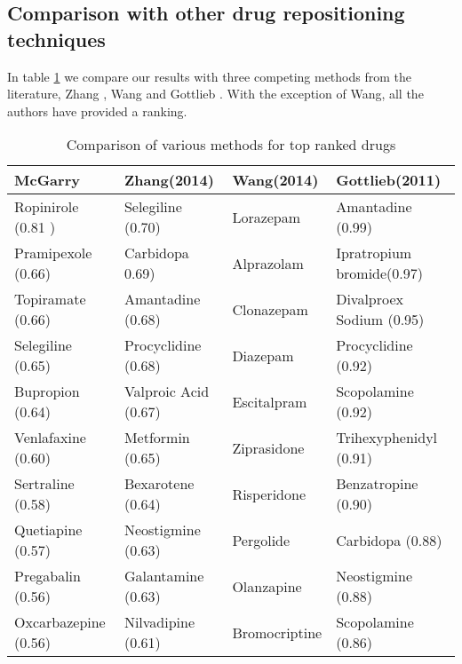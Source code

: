 \documentclass[preprint,12pt]{elsarticle}
\begin{document}
\subsection{Comparison with other drug repositioning techniques}
In table \ref{comparison} we compare our results with three competing methods from the literature, Zhang \cite{Zhang2014}, Wang \cite{Wang2014} and Gottlieb \cite{Gottlieb2011}. With the exception of Wang, all the authors have provided a ranking.

\begin{table}[h]
\centering \caption{Comparison of various methods for top ranked drugs}\label{comparison}
\scriptsize
\begin{tabular}{llll}
  \hline
 McGarry &  Zhang(2014) & Wang(2014) & Gottlieb(2011) \\ 
  \hline
  Ropinirole (0.81 ) & Selegiline (0.70) & Lorazepam & Amantadine (0.99)\\
  Pramipexole (0.66) & Carbidopa 0.69) & Alprazolam& Ipratropium bromide(0.97)\\
  Topiramate  (0.66) & Amantadine (0.68) & Clonazepam& Divalproex Sodium (0.95) \\
  Selegiline (0.65) & Procyclidine (0.68) & Diazepam & Procyclidine (0.92) \\
  Bupropion (0.64) & Valproic Acid (0.67) & Escitalpram & Scopolamine (0.92) \\
  Venlafaxine (0.60) & Metformin (0.65) & Ziprasidone & Trihexyphenidyl (0.91) \\
  Sertraline  (0.58) & Bexarotene (0.64) & Risperidone& Benzatropine (0.90) \\
  Quetiapine (0.57) & Neostigmine (0.63) & Pergolide & Carbidopa (0.88)\\
  Pregabalin (0.56) & Galantamine (0.63) & Olanzapine& Neostigmine (0.88)\\
  Oxcarbazepine (0.56) & Nilvadipine (0.61) & Bromocriptine & Scopolamine (0.86) \\
   \hline
\end{tabular}
\end{table}
\normalsize
\end{document}

